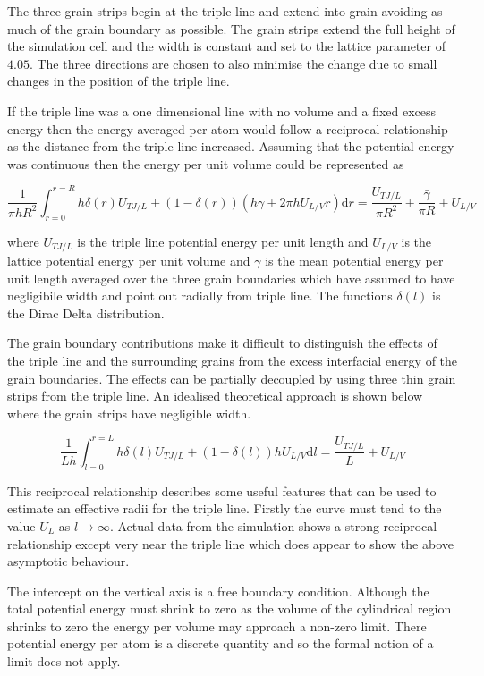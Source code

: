\documentclass[12pt,a4paper]{book}
\begin{document}
The three grain strips begin at the triple line and extend into grain avoiding as much of the grain boundary as possible. The grain strips extend the full height of the simulation cell and the width is constant and set to the lattice parameter of $4.05$. The three directions are chosen to also minimise the change due to small changes in the position of the triple line. 

If the triple line was a one dimensional line with no volume and a fixed excess energy then the energy averaged per atom would follow a reciprocal relationship as the distance from the triple line increased. Assuming that the potential energy was continuous then the energy per unit volume could be represented as 

\[ \frac{1}{\pi h R^2}\int_{r=0}^{r=R} h \delta(r) U_{TJ/L} + (1-\delta(r) )\left( h \bar{\gamma} + 2 \pi h U_{L/V} r \right) \text{d}r = \frac{U_{TJ/L}}{\pi R^2} + \frac{\bar{\gamma}}{\pi R} + U_{L/V} \]

where $U_{TJ/L}$ is the triple line potential energy per unit length and $U_{L/V}$ is the lattice potential energy per unit volume and $\bar{\gamma}$ is the mean potential energy per unit length averaged over the three grain boundaries which have assumed to have negligibile width and point out radially from triple line. The functions $\delta(l)$ is the Dirac Delta distribution.

The grain boundary contributions make it difficult to distinguish the effects of the triple line and the surrounding grains from the excess interfacial energy of the grain boundaries. The effects can be partially decoupled by using three thin grain strips from the triple line. An idealised theoretical approach is shown below where the grain strips have negligible width.

\[ \frac{1}{L h}\int_{l=0}^{r=L} h \delta(l) U_{TJ/L} + (1-\delta(l) ) h U_{L/V}  \text{d}l = \frac{U_{TJ/L}}{L}  + U_{L/V} 
\label{eq:L1}
\]


This reciprocal relationship describes some useful features that can be used to estimate an effective radii for the triple line. Firstly the curve must tend to the value $U_L$ as $l \rightarrow \infty$. Actual data from the simulation shows a strong reciprocal relationship except very near the triple line which does appear to show the above asymptotic behaviour. 

The intercept on the vertical axis is a free boundary condition. Although the total potential energy must shrink to zero as the volume of the cylindrical region shrinks to zero the energy per volume may approach a non-zero limit. There potential energy per atom is a discrete quantity and so the formal notion of a limit does not apply. 
\end{document}
